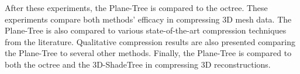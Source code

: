 After these experiments, the Plane-Tree is compared to the octree. These experiments compare both methods' efficacy in compressing 3D mesh data. The Plane-Tree is also compared to various state-of-the-art compression techniques from the literature. Qualitative compression results are also presented comparing the Plane-Tree to several other methods. Finally, the Plane-Tree is compared to both the octree and the 3D-ShadeTree in compressing 3D reconstructions. \\
